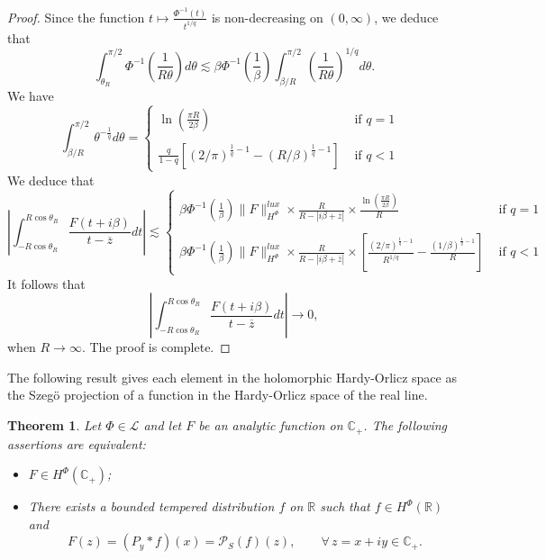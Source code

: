 \documentclass[a4paper,12pt,intlimits,oneside]{amsart}
\newtheorem{theorem}{Theorem}[section]
\theoremstyle{definition}
\numberwithin{equation}{section}
\theoremstyle{definition}
\begin{document}
\begin{proof}
Since the function $t\mapsto \frac{\Phi^{-1}(t)}{t^{1/q}}$ is non-decreasing on $(0, \infty)$, we deduce that
$$  \int_{\theta_{R}}^{\pi/2} \Phi^{-1}\left(\frac{1}{ R\theta}\right)d\theta \lesssim  \beta\Phi^{-1}\left(\frac{1}{ \beta}\right)\int_{\beta/R}^{\pi/2} \left(\frac{1}{ R\theta}\right)^{1/q} d\theta.  $$
We have
\[ \int_{\beta/R}^{\pi/2} \theta^{-\frac{1}{q}} d\theta=
\left\{
\begin{array}{ll} \ln\left( \frac{\pi R}{2 \beta} \right) & \mbox{ if $q=1$ }\\\\ \frac{q}{1-q}[ (2/\pi)^{\frac{1}{q}-1}  - (R/\beta)^{\frac{1}{q}-1}] & \mbox{ if $q<1$}
\end{array}
\right. \]
We deduce that
\[ \left|\int_{-R\cos \theta_{R}}^{R\cos \theta_{R}}\frac{F(t+i\beta)}{t-\overline{z}}dt \right|\lesssim
\left\{
\begin{array}{ll}\beta\Phi^{-1}\left(\frac{1}{ \beta}\right) \|F\|_{H^{\Phi}}^{lux} \times\frac{R}{R- |i\beta+\overline{z}|} \times\frac{\ln\left( \frac{\pi R}{2 \beta}\right)}{R} & \mbox{ if $q=1$ }\\\\ \beta\Phi^{-1}\left(\frac{1}{ \beta}\right) \|F\|_{H^{\Phi}}^{lux} \times\frac{R}{R- |i\beta+\overline{z}|} \times \left[ \frac{(2/\pi)^{\frac{1}{q}-1}}{R^{1/q}}  - \frac{(1/\beta)^{\frac{1}{q}-1}}{R}\right]& \mbox{ if $q<1$}
\end{array}
\right. \]
It follows that
$$ \left|\int_{-R\cos \theta_{R}}^{R\cos \theta_{R}}\frac{F(t+i\beta)}{t-\overline{z}}dt \right|  \longrightarrow 0, 
        $$
when $R\longrightarrow \infty$.    The proof is complete.     
\end{proof}


The following result gives each element in the holomorphic Hardy-Orlicz space as the Szeg\"o projection of a function in the Hardy-Orlicz space of the real line.
\begin{theorem}\label{pro:main6mmq4p}
Let $\Phi \in \mathscr{L}$ and let $F$ be an analytic function on $\mathbb{C}_{+}$. The following assertions are equivalent:
\begin{itemize}
\item[(i)] $F \in H^{\Phi}(\mathbb{C}_{+})$;
\item[(ii)] There exists a bounded tempered distribution $f$ on $\mathbb{R}$ such that $f \in H^{\Phi}(\mathbb{R})$ and
\[
F(z)= (P_{y} \ast f)(x)= \mathcal{P}_{S}(f)(z), \qquad \forall\, z=x+iy \in \mathbb{C}_{+}.
\]
\end{itemize}
\end{theorem}
\end{document}
